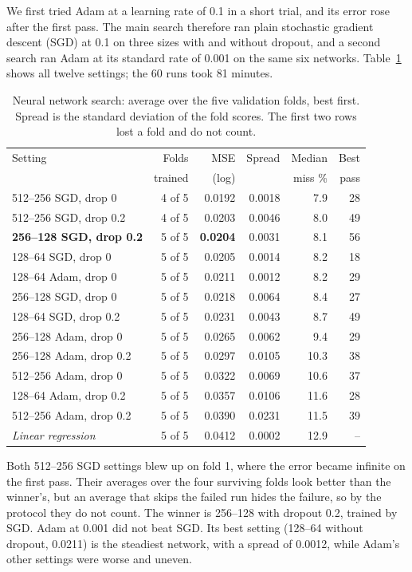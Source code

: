 \documentclass[sigconf,nonacm,10pt]{acmart}
\begin{document}
We first tried Adam \cite{kingma2015} at a learning rate of 0.1 in a short trial, and its error rose after the first pass. The main search therefore ran plain stochastic gradient descent (SGD) at 0.1 on three sizes with and without dropout, and a second search ran Adam at its standard rate of 0.001 on the same six networks. Table~\ref{tab:nn} shows all twelve settings; the 60 runs took 81 minutes.

\begin{table}[t]
\caption{Neural network search: average over the five validation folds, best first. Spread is the standard deviation of the fold scores. The first two rows lost a fold and do not count.}
\label{tab:nn}
\small
\setlength{\tabcolsep}{3pt}
\begin{tabular}{@{}lrrrrr@{}}
\toprule
Setting & Folds & MSE & Spread & Median & Best \\
 & trained & (log) & & miss \% & pass \\
\midrule
512--256 SGD, drop 0 & 4 of 5 & 0.0192 & 0.0018 & 7.9 & 28 \\
512--256 SGD, drop 0.2 & 4 of 5 & 0.0203 & 0.0046 & 8.0 & 49 \\
\textbf{256--128 SGD, drop 0.2} & 5 of 5 & \textbf{0.0204} & 0.0031 & 8.1 & 56 \\
128--64 SGD, drop 0 & 5 of 5 & 0.0205 & 0.0014 & 8.2 & 18 \\
128--64 Adam, drop 0 & 5 of 5 & 0.0211 & 0.0012 & 8.2 & 29 \\
256--128 SGD, drop 0 & 5 of 5 & 0.0218 & 0.0064 & 8.4 & 27 \\
128--64 SGD, drop 0.2 & 5 of 5 & 0.0231 & 0.0043 & 8.7 & 49 \\
256--128 Adam, drop 0 & 5 of 5 & 0.0265 & 0.0062 & 9.4 & 29 \\
256--128 Adam, drop 0.2 & 5 of 5 & 0.0297 & 0.0105 & 10.3 & 38 \\
512--256 Adam, drop 0 & 5 of 5 & 0.0322 & 0.0069 & 10.6 & 37 \\
128--64 Adam, drop 0.2 & 5 of 5 & 0.0357 & 0.0106 & 11.6 & 28 \\
512--256 Adam, drop 0.2 & 5 of 5 & 0.0390 & 0.0231 & 11.5 & 39 \\
\midrule
\emph{Linear regression} & 5 of 5 & 0.0412 & 0.0002 & 12.9 & -- \\
\bottomrule
\end{tabular}
\end{table}

Both 512--256 SGD settings blew up on fold 1, where the error became infinite on the first pass. Their averages over the four surviving folds look better than the winner's, but an average that skips the failed run hides the failure, so by the protocol they do not count. The winner is 256--128 with dropout 0.2, trained by SGD. Adam at 0.001 did not beat SGD. Its best setting (128--64 without dropout, 0.0211) is the steadiest network, with a spread of 0.0012, while Adam's other settings were worse and uneven.
\end{document}
